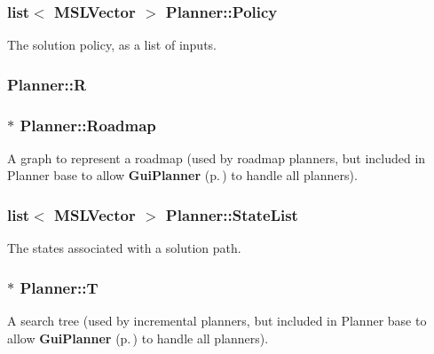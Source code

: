 \subsubsection{\setlength{\rightskip}{0pt plus 5cm}list$<$ {\bf MSLVector} $>$ Planner::Policy}\label{class_Planner_m3}


The solution policy, as a list of inputs.

\subsubsection{ Planner::R\hspace{0.3cm}{\tt  [protected]}}\label{class_Planner_n0}


\subsubsection{ $\ast$ Planner::Roadmap}\label{class_Planner_m9}


A graph to represent a roadmap (used by roadmap planners, but included in Planner base to allow {\bf Gui\-Planner} {\rm (p.\,\pageref{class_GuiPlanner})} to handle all planners).

\subsubsection{\setlength{\rightskip}{0pt plus 5cm}list$<$ {\bf MSLVector} $>$ Planner::State\-List}\label{class_Planner_m11}


The states associated with a solution path.

\subsubsection{ $\ast$ Planner::T}\label{class_Planner_m7}


A search tree (used by incremental planners, but included in Planner base to allow {\bf Gui\-Planner} {\rm (p.\,\pageref{class_GuiPlanner})} to handle all planners).


